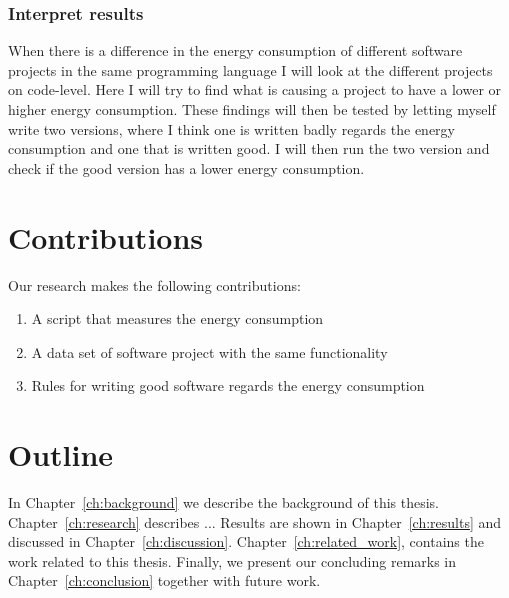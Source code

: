\subsubsection{Interpret results}
When there is a difference in the energy consumption of different software projects in the same programming language I will look at the different projects on code-level. Here I will try to find what is causing a project to have a lower or higher energy consumption. These findings will then be tested by letting myself write two versions, where I think one is written badly regards the energy consumption and one that is written good. I will then run the two version and check if the good version has a lower energy consumption.

\section{Contributions}
Our research makes the following contributions:
\begin{enumerate}
	\item A script that measures the energy consumption
	\item A data set of software project with the same functionality
	\item Rules for writing good software regards the energy consumption
\end{enumerate}

\section{Outline}
In Chapter~\ref{ch:background} we describe the background of this thesis. 
Chapter~\ref{ch:research} describes ... 
Results are shown in Chapter~\ref{ch:results} and discussed in Chapter~\ref{ch:discussion}. Chapter~\ref{ch:related_work}, contains the work related to this thesis.
Finally, we present our concluding remarks in Chapter~\ref{ch:conclusion} together with future work.

